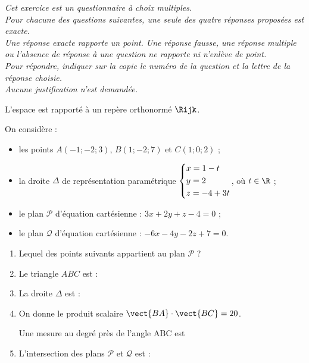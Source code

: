 \emph{Cet exercice est un questionnaire à choix multiples.\\Pour chacune des questions suivantes, une seule des quatre réponses proposées est exacte.\\	Une réponse exacte rapporte un point. Une réponse fausse, une réponse multiple ou l’absence de réponse à une question ne rapporte ni n’enlève de point.\\Pour répondre, indiquer sur la copie le numéro de la question et la lettre de la réponse choisie.\\Aucune justification n’est demandée.}

\bigskip

L’espace est rapporté à un repère orthonormé $\Rijk$.

On considère :

\begin{itemize}
	\item les points $A(-1;-2;3)$, $B(1;-2;7)$ et $C(1;0;2)$ ;
	\item la droite $\Delta$ de représentation paramétrique $\begin{dcases} x = 1- t \\ y = 2 \\ z = -4+3t \end{dcases}$, où $t \in \R$ ;
	\item le plan $\mathcal{P}$ d’équation cartésienne : $3x +2y + z -4 = 0$ ;
	\item le plan $\mathcal{Q}$ d’équation cartésienne : $-6x -4y -2z +7 = 0$.
\end{itemize}

\begin{enumerate}
	\item Lequel des points suivants appartient au plan $\mathcal{P}$ ?
	
	\medskip
	
	\item Le triangle $ABC$ est :
	
	\medskip
	
	\item La droite $\Delta$ est :
	
	\medskip
	
	\item On donne le produit scalaire $\vect{BA}\cdot\vect{BC}=20$.
	
	Une mesure au degré près de l’angle ABC est
	
	\medskip
	
	\item L’intersection des plans $\mathcal{P}$ et $\mathcal{Q}$ est :
	
	\medskip
	
\end{enumerate}